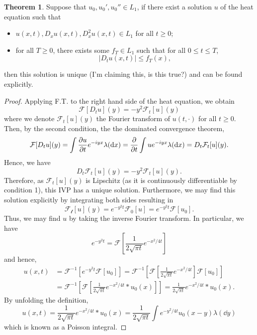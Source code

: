 \documentclass[]{article}
\theoremstyle{definition}
\newtheorem{theorem}{Theorem}
\theoremstyle{definition}
\begin{document}
\begin{theorem}
  Suppose that \(u_0, u_0', u_0'' \in L_1\), if there exist a solution \(u\) of the 
  heat equation such that 
  \begin{itemize}
    \item \(u(x, t), D_x u(x ,t), D^2_x u(x, t) \in L_1\) for all \(t \ge 0\);
    \item for all \(T \ge 0\), there exists some \(f_T \in L_1\) such that 
      for all \(0 \le t \le T\),
      \[|D_t u(x, t)| \le f_T(x),\]
  \end{itemize}
  then this solution is unique (I'm claiming this, is this true?) 
  and can be found explicitly.
\end{theorem}
\begin{proof}
  Applying F.T. to the right hand side of the heat equation, we obtain 
  \[\mathcal{F}[D_t u](y) = -y^2 \mathcal{F}_t[u](y)\]
  where we denote \(\mathcal{F}_t[u](y)\) the Fourier transform of \(u(t, \cdot)\) 
  for all \(t \ge 0\). Then, by the second condition, the the dominated 
  convergence theorem, 
  \[\mathcal{F}[D_t u](y) = \int \pdv{u}{t} e^{-iyx} \lambda(\dd x) 
    = \pdv{t} \int ue^{-iy x} \lambda(\dd x) = D_t \mathcal{F}_t[u](y).\]
  Hence, we have 
  \[D_t \mathcal{F}_t[u](y) = -y^2 \mathcal{F}_t[u](y).\]
  Therefore, as \(\mathcal{F}_t[u](y)\) is Lipschitz (as it is continuously 
  differentiable by condition 1), this IVP has a unique solution. Furthermore, 
  we may find this solution explicitly by integrating both sides resulting in 
  \[\mathcal{F_t}[u](y) = e^{-y^2 t}\mathcal{F}_0[u] = e^{-y^2 t}\mathcal{F}[u_0].\]
  Thus, we may find \(u\) by taking the inverse Fourier transform. In particular, 
  we have 
  \[e^{-y^2 t} = \mathcal{F}\left[\frac{1}{2\sqrt{\pi t}} e^{-x^2 / 4t}\right]\]
  and hence, 
  \[\begin{split}
    u(x, t) & = \mathcal{F}^{-1}[e^{-y^2 t}\mathcal{F}[u_0]] = 
    \mathcal{F}^{-1}\left[\mathcal{F}\left[\frac{1}{2\sqrt{\pi t}} e^{-x^2 / 4t}\right]\mathcal{F}[u_0]\right]\\
    & = \mathcal{F}^{-1}\left[\mathcal{F}\left[\frac{1}{2\sqrt{\pi t}} e^{-x^2 / 4t} * u_0(x)\right]\right]
      = \frac{1}{2\sqrt{\pi t}} e^{-x^2 / 4t} * u_0(x).
  \end{split}\]
  By unfolding the definition, 
  \[u(x, t) = \frac{1}{2\sqrt{\pi t}} e^{-x^2 / 4t} * u_0(x) 
  = \frac{1}{2\sqrt{\pi t}} \int e^{- y^2 / 4t}u_0(x - y) \lambda(\dd y)\]
  which is known as a Poisson integral.
\end{proof}
\end{document}
